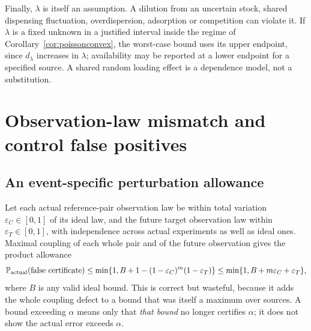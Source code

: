 \documentclass[11pt]{article}
\theoremstyle{remark}\newtheorem{remark}[theorem]{Remark}
\newcommand{\Prob}{\mathbb P}
\begin{document}
Finally, $\lambda$ is itself an assumption. A dilution from an uncertain stock,
shared dispensing fluctuation, overdispersion, adsorption or competition can
violate it. If $\lambda$ is a fixed unknown in a justified interval inside the
regime of Corollary~\ref{cor:poissonconvex}, the worst-case bound uses its upper
endpoint, since $d_\lambda$ increases in $\lambda$; availability may be reported
at a lower endpoint for a specified source. A shared random loading effect is a
dependence model, not a substitution.

\section{Observation-law mismatch and control false positives}\label{sec:robust}
\subsection{An event-specific perturbation allowance}
Let each actual reference-pair observation law be within total variation
$\varepsilon_C\in[0,1]$ of its ideal law, and the future target observation law
within $\varepsilon_T\in[0,1]$, with independence across actual experiments as
well as ideal ones. Maximal coupling of each whole pair and of the future
observation gives the product allowance
\begin{equation}\label{eq:TV}
\Prob_{\rm actual}(\text{false certificate})
\le\min\{1,B+1-(1-\varepsilon_C)^m(1-\varepsilon_T)\}
\le\min\{1,B+m\varepsilon_C+\varepsilon_T\},
\end{equation}
where $B$ is any valid ideal bound. This is correct but wasteful, because it
adds the whole coupling defect to a bound that was itself a maximum over
sources. A bound exceeding $\alpha$ means only that \emph{that bound} no longer
certifies $\alpha$; it does not show the actual error exceeds $\alpha$.
\end{document}
